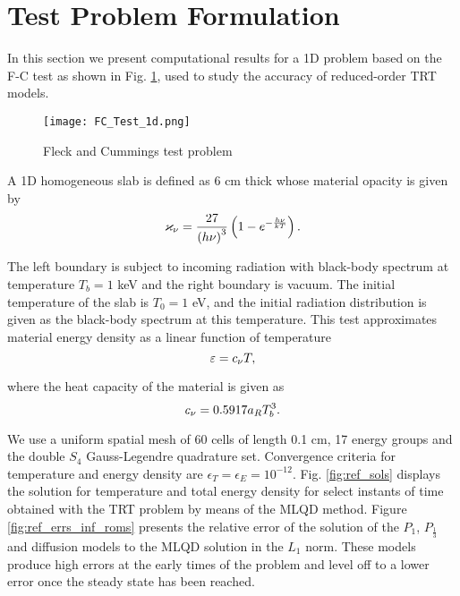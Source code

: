 \section{Test Problem Formulation} \label{sec:mpod_test} 
	In this section we present computational results for a 1D problem based on the F-C test \cite{fleck-1971} as shown in Fig. \ref{fig:FC_Test_1d}, used to study the accuracy of reduced-order TRT models. 
	\begin{figure}[ht!]
		\centering
		\captionsetup{justification=centering,margin=2cm}
		\texttt{[image: FC\_Test\_1d.png]}
		\caption{\label{fig:FC_Test_1d}
			Fleck and Cummings test problem}
	\end{figure}

	A 1D homogeneous slab is defined as 6 cm thick whose material opacity is given by
	\begin{equation}
		\varkappa_{\nu} = \frac{27}{\left( h\nu\right)^3}\left(1-e^{-\frac{h\nu}{kT}}\right).
	\end{equation}
	
	The left boundary is subject to incoming radiation with black-body spectrum at temperature $T_b = 1$ keV and the right boundary is vacuum. The initial temperature of the slab is $T_0 =1$ eV, and the initial radiation distribution is given as the black-body spectrum at this temperature. This test approximates material energy density as a linear function of temperature
	\begin{equation}
		\varepsilon = c_{\nu} T,
	\end{equation}
	
	where the heat capacity of the material is given as
	\begin{equation}
		c_{\nu} = 0.5917a_R T_b^3.
	\end{equation}
	
	We use a uniform spatial mesh of 60 cells of length 0.1 cm, 17 energy groups and the double $S_4$ Gauss-Legendre quadrature set. Convergence criteria for temperature and energy density are $\epsilon_T=\epsilon_E=10^{-12}$. Fig. \ref{fig:ref_sols} displays the solution for temperature and total energy density for select instants of time obtained with the TRT problem by means of the MLQD method. Figure \ref{fig:ref_errs_inf_roms} presents the relative error of the solution of the $P_1$, $P_{\frac{1}{3}}$ and diffusion models to the MLQD solution in the $L_1$ norm. These models produce high errors at the early times of the problem and level off to a lower error once the steady state has been reached.
	
